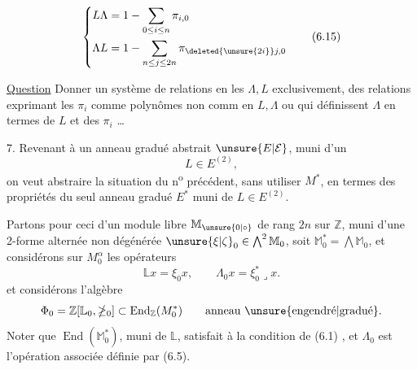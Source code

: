 
\[
 \left\{\begin{aligned}
 L\Lambda&=1-\sum_{0\le i\le n}\pi_{i,0}\\
 \Lambda L&=1-\sum_{n\le j\le 2n}\pi_{\deleted{\unsure{2i}}j,0}
 \end{aligned}\right.
 \tag*{(6.15)}
\]

\uline{Question} Donner un système de  relations en les $\Lambda,L$ exclusivement,  des relations exprimant les $\pi_i$ comme polynômes non comm en $L,\Lambda$ ou qui définissent $\Lambda$ en termes de $L$ et des $\pi_i$ \ldots

7. Revenant à un anneau gradué abstrait $\unsure{E|\mathcal E}$, muni d'un
\[
 L\in E^{(2)},
\]
on veut abstraire la situation du n\textsuperscript{o} précédent, sans utiliser $M^*$, en termes des propriétés du seul anneau  gradué $E^*$ muni de $L\in E^{(2)}$.

Partons pour ceci d'un module libre $\mathbb{M}_{\unsure{0|\circ}}$ de rang $2n$ sur $\mathbb Z$, muni d'une 2-forme alternée non dégénérée  $\unsure{\xi|\zeta}_0\in\bigwedge^2\mathbb M_0$,  soit \deleted{\unsure{$\xi$}} $\mathbb M_0^*=\bigwedge\mathbb M_0$, et considérons sur $M_0^\alpha$ les opérateurs
\[
 \mathbb L x=\xi_0x,\qquad \mathbb{\Lambda}_0x=\xi_0^*\mathbin{\lrcorner}x .
\]
et considérons l'algèbre
\[
 \Phi_0=\mathbb Z[\mathbb L_0,\mathbb{\Lambda}_0]\subset\operatorname{End}_{\mathbb Z}(M_0^*)\qquad\text{anneau \unsure{engendré|gradué}.}
\]
Noter que $\operatorname{End}(\mathbb M_0^*)$,  muni de $\mathbb L$, satisfait à la condition de (6.1) ,  et \deleted{\unsure{$\xi$}} $\mathbb{\Lambda}_0$ est l'opération associée définie par (6.5).
